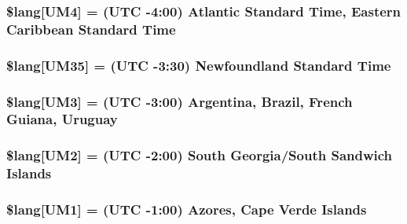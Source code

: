 \subsubsection[{\$lang}]{\setlength{\rightskip}{0pt plus 5cm}\$lang\mbox{[}\textquotesingle{}U\+M4\textquotesingle{}\mbox{]} = \textquotesingle{}(U\+T\+C -\/4\+:00) Atlantic Standard Time, Eastern Caribbean Standard Time\textquotesingle{}}\label{date__lang_8php_a42f66872f4a082bcb2ee004bd2716828}
\hypertarget{date__lang_8php_a389c4a60af83efd29503f60033f3071d}{}
\subsubsection[{\$lang}]{\setlength{\rightskip}{0pt plus 5cm}\$lang\mbox{[}\textquotesingle{}U\+M35\textquotesingle{}\mbox{]} = \textquotesingle{}(U\+T\+C -\/3\+:30) Newfoundland Standard Time\textquotesingle{}}\label{date__lang_8php_a389c4a60af83efd29503f60033f3071d}
\hypertarget{date__lang_8php_abd67512895187d494bbfb18f8d8fee43}{}
\subsubsection[{\$lang}]{\setlength{\rightskip}{0pt plus 5cm}\$lang\mbox{[}\textquotesingle{}U\+M3\textquotesingle{}\mbox{]} = \textquotesingle{}(U\+T\+C -\/3\+:00) Argentina, Brazil, French Guiana, Uruguay\textquotesingle{}}\label{date__lang_8php_abd67512895187d494bbfb18f8d8fee43}
\hypertarget{date__lang_8php_a8ee2f132b462bb709fc3402a592ff573}{}
\subsubsection[{\$lang}]{\setlength{\rightskip}{0pt plus 5cm}\$lang\mbox{[}\textquotesingle{}U\+M2\textquotesingle{}\mbox{]} = \textquotesingle{}(U\+T\+C -\/2\+:00) South Georgia/South Sandwich Islands\textquotesingle{}}\label{date__lang_8php_a8ee2f132b462bb709fc3402a592ff573}
\hypertarget{date__lang_8php_a036e0074236b996b33231b051eda2973}{}
\subsubsection[{\$lang}]{\setlength{\rightskip}{0pt plus 5cm}\$lang\mbox{[}\textquotesingle{}U\+M1\textquotesingle{}\mbox{]} = \textquotesingle{}(U\+T\+C -\/1\+:00) Azores, Cape Verde Islands\textquotesingle{}}\label{date__lang_8php_a036e0074236b996b33231b051eda2973}
\hypertarget{date__lang_8php_ab153b3219e74743184b7dee67e86f9fc}{}
